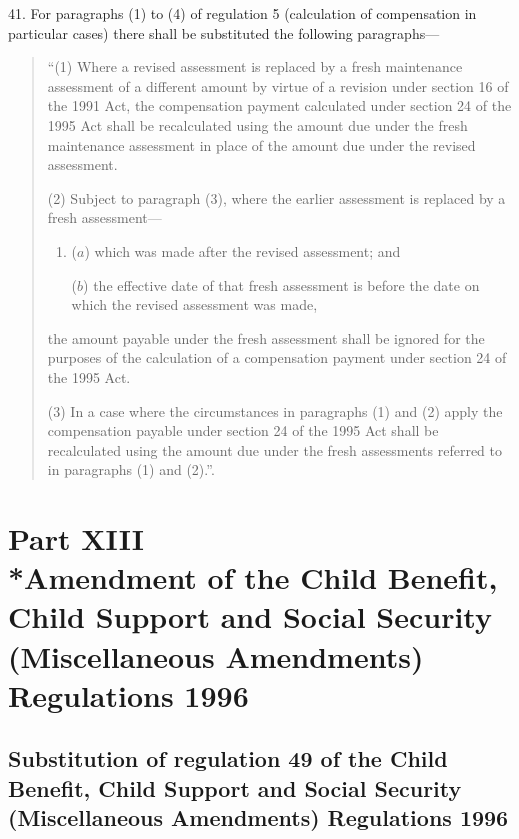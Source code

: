 \documentclass[12pt,a4paper]{article}
\begin{document}
41.  For paragraphs (1) to (4) of regulation 5 (calculation of compensation in particular cases) there shall be substituted the following paragraphs—
\begin{quotation}
“(1) Where a revised assessment is replaced by a fresh maintenance assessment of a different amount by virtue of a revision under section 16 of the 1991 Act, the compensation payment calculated under section 24 of the 1995 Act shall be recalculated using the amount due under the fresh maintenance assessment in place of the amount due under the revised assessment.

(2) Subject to paragraph (3), where the earlier assessment is replaced by a fresh assessment—
\begin{enumerate}\item[]
($a$) which was made after the revised assessment; and

($b$) the effective date of that fresh assessment is before the date on which the revised assessment was made,
\end{enumerate}
the amount payable under the fresh assessment shall be ignored for the purposes of the calculation of a compensation payment under section 24 of the 1995 Act.

(3) In a case where the circumstances in paragraphs (1) and (2) apply the compensation payable under section 24 of the 1995 Act shall be recalculated using the amount due under the fresh assessments referred to in paragraphs (1) and (2).”.
\end{quotation}

\section[Part XIII --- Amendment of the Child Benefit, Child Support and Social Security (Miscellaneous Amendments) Regulations 1996]{Part XIII\\*Amendment of the Child Benefit, Child Support and Social Security (Miscellaneous Amendments) Regulations 1996}

\renewcommand\parthead{--- Part XIII}

\subsection[42. Substitution of regulation 49 of the Child Benefit, Child Support and Social Security (Miscellaneous Amendments) Regulations 1996]{Substitution of regulation 49 of the Child Benefit, Child Support and Social Security (Miscellaneous Amendments) Regulations 1996}
\end{document}
